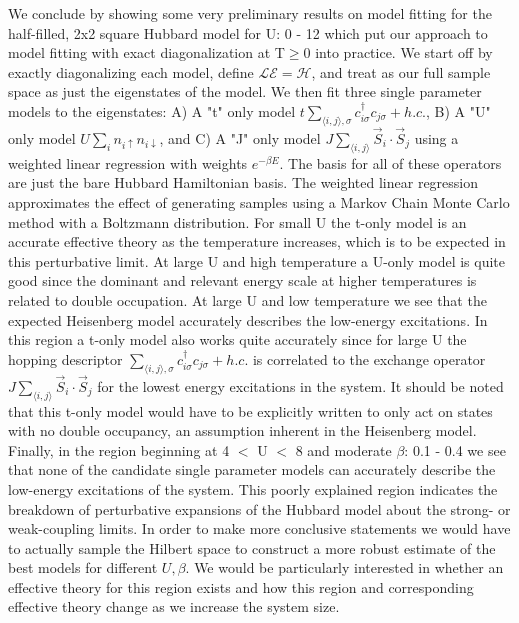 \documentclass[12pt]{article}
\begin{document}
We conclude by showing some very preliminary results on model fitting for the half-filled, 2x2 square Hubbard model for U: 0 - 12 which put our approach to model fitting with exact diagonalization at T$\geq 0$ into practice.
We start off by exactly diagonalizing each model, define $\mathcal{LE} = \mathcal{H}$, and treat as our full sample space as just the eigenstates of the model.
We then fit three single parameter models to the eigenstates: A) 
A "t" only model $t \sum_{\langle i, j \rangle, \sigma} c_{i\sigma}^\dagger c_{j\sigma} + h.c.$, B) A "U" only model $U \sum_{i} n_{i\uparrow} n_{i\downarrow}$, and C) A "J" only model $J \sum_{\langle i,j \rangle} \vec{S}_i \cdot \vec{S}_j$ using a weighted linear regression with weights $e^{-\beta E}$.
The basis for all of these operators are just the bare Hubbard Hamiltonian basis.
The weighted linear regression approximates the effect of generating samples using a Markov Chain Monte Carlo method with a Boltzmann distribution.
For small U the t-only model is an accurate effective theory as the temperature increases, which is to be expected in this perturbative limit.
At large U and high temperature a U-only model is quite good since the dominant and relevant energy scale at higher temperatures is related to double occupation.
At large U and low temperature we see that the expected Heisenberg model accurately describes the low-energy excitations. 
In this region a t-only model also works quite accurately since for large U the hopping descriptor $\sum_{\langle i, j \rangle, \sigma} c_{i\sigma}^\dagger c_{j\sigma} + h.c.$ is correlated to the exchange operator $J \sum_{\langle i,j \rangle} \vec{S}_i \cdot \vec{S}_j$ for the lowest energy excitations in the system.
It should be noted that this t-only model would have to be explicitly written to only act on states with no double occupancy, an assumption inherent in the Heisenberg model. 
Finally, in the region beginning at 4 $<$ U $<$ 8 and moderate $\beta$: 0.1 - 0.4 we see that none of the candidate single parameter models can accurately describe the low-energy excitations of the system.
This poorly explained region indicates the breakdown of perturbative expansions of the Hubbard model about the strong- or weak-coupling limits.
In order to make more conclusive statements we would have to actually sample the Hilbert space to construct a more robust estimate of the best models for different $U, \beta$.
We would be particularly interested in whether an effective theory for this region exists and how this region and corresponding effective theory change as we increase the system size.
\end{document}
